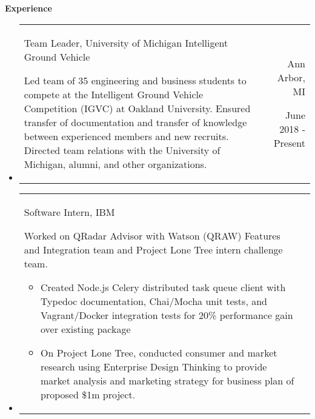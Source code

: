 \documentclass[9pt]{memoir}
\begin{document}
\begin{mdframed}
\textbf{Experience}
\end{mdframed}

\begin{itemize}

\item

\begin{tabular}[t]{lr}

\begin{minipage}[t]{0.7 \textwidth}
\raggedright

\normalsize
Team Leader, University of Michigan Intelligent Ground Vehicle

\small

Led team of 35 engineering and business students to compete at the Intelligent Ground Vehicle
Competition (IGVC) at Oakland University. Ensured transfer of documentation and transfer of
knowledge between experienced members and new recruits. Directed team relations with the
University of Michigan, alumni, and other organizations.

\end{minipage}

&

\begin{minipage}[t]{0.2 \textwidth}
\raggedleft

\normalsize
Ann Arbor, MI

\small
June 2018 - Present
\end{minipage}

\\

\end{tabular}

\item

\begin{tabular}[t]{lr}

\begin{minipage}[t]{0.7 \textwidth}
\raggedright

\normalsize
Software Intern, IBM

\small

Worked on QRadar Advisor with Watson (QRAW) Features and Integration team and Project Lone
Tree intern challenge team.

\begin{itemize}
\item Created Node.js Celery distributed task queue client with Typedoc documentation, Chai/Mocha
      unit tests, and Vagrant/Docker integration tests for 20\% performance gain over existing
      package
\item On Project Lone Tree, conducted consumer and market research using Enterprise Design Thinking
      to provide market analysis and marketing strategy for business plan of proposed \$1m project.
\end{itemize}


\end{minipage}
\end{tabular}
\end{itemize}
\end{document}

